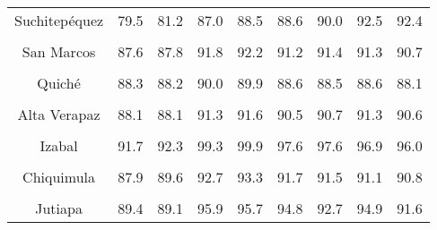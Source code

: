{\begin{tabular}[t]{ccccccccc}
Suchitepéquez & 79.5 & 81.2 & 87.0 & 88.5 & 88.6 & 90.0 & 92.5 & 92.4\\
\cellcolor[HTML]{B6B3FF}{Retalhuleu} & \cellcolor[HTML]{B6B3FF}{88.3} & \cellcolor[HTML]{B6B3FF}{86.5} & \cellcolor[HTML]{B6B3FF}{95.1} & \cellcolor[HTML]{B6B3FF}{94.4} & \cellcolor[HTML]{B6B3FF}{93.8} & \cellcolor[HTML]{B6B3FF}{91.6} & \cellcolor[HTML]{B6B3FF}{93.7} & \cellcolor[HTML]{B6B3FF}{91.3}\\
San Marcos & 87.6 & 87.8 & 91.8 & 92.2 & 91.2 & 91.4 & 91.3 & 90.7\\
\cellcolor[HTML]{B6B3FF}{Huehuetenango} & \cellcolor[HTML]{B6B3FF}{86.8} & \cellcolor[HTML]{B6B3FF}{85.7} & \cellcolor[HTML]{B6B3FF}{88.1} & \cellcolor[HTML]{B6B3FF}{86.3} & \cellcolor[HTML]{B6B3FF}{87.2} & \cellcolor[HTML]{B6B3FF}{84.5} & \cellcolor[HTML]{B6B3FF}{86.5} & \cellcolor[HTML]{B6B3FF}{83.1}\\
Quiché & 88.3 & 88.2 & 90.0 & 89.9 & 88.6 & 88.5 & 88.6 & 88.1\\
\cellcolor[HTML]{B6B3FF}{Baja Verapaz} & \cellcolor[HTML]{B6B3FF}{84.8} & \cellcolor[HTML]{B6B3FF}{85.4} & \cellcolor[HTML]{B6B3FF}{89.0} & \cellcolor[HTML]{B6B3FF}{89.7} & \cellcolor[HTML]{B6B3FF}{85.6} & \cellcolor[HTML]{B6B3FF}{86.6} & \cellcolor[HTML]{B6B3FF}{85.6} & \cellcolor[HTML]{B6B3FF}{86.2}\\
Alta Verapaz & 88.1 & 88.1 & 91.3 & 91.6 & 90.5 & 90.7 & 91.3 & 90.6\\
\cellcolor[HTML]{B6B3FF}{Petén} & \cellcolor[HTML]{B6B3FF}{89.8} & \cellcolor[HTML]{B6B3FF}{89.7} & \cellcolor[HTML]{B6B3FF}{99.5} & \cellcolor[HTML]{B6B3FF}{99.1} & \cellcolor[HTML]{B6B3FF}{95.7} & \cellcolor[HTML]{B6B3FF}{95.2} & \cellcolor[HTML]{B6B3FF}{93.0} & \cellcolor[HTML]{B6B3FF}{91.6}\\
Izabal & 91.7 & 92.3 & 99.3 & 99.9 & 97.6 & 97.6 & 96.9 & 96.0\\
\cellcolor[HTML]{B6B3FF}{Zacapa} & \cellcolor[HTML]{B6B3FF}{86.8} & \cellcolor[HTML]{B6B3FF}{90.0} & \cellcolor[HTML]{B6B3FF}{92.7} & \cellcolor[HTML]{B6B3FF}{96.6} & \cellcolor[HTML]{B6B3FF}{91.6} & \cellcolor[HTML]{B6B3FF}{94.0} & \cellcolor[HTML]{B6B3FF}{91.2} & \cellcolor[HTML]{B6B3FF}{93.3}\\
Chiquimula & 87.9 & 89.6 & 92.7 & 93.3 & 91.7 & 91.5 & 91.1 & 90.8\\
\cellcolor[HTML]{B6B3FF}{Jalapa} & \cellcolor[HTML]{B6B3FF}{84.8} & \cellcolor[HTML]{B6B3FF}{85.3} & \cellcolor[HTML]{B6B3FF}{89.5} & \cellcolor[HTML]{B6B3FF}{89.7} & \cellcolor[HTML]{B6B3FF}{88.5} & \cellcolor[HTML]{B6B3FF}{88.7} & \cellcolor[HTML]{B6B3FF}{89.8} & \cellcolor[HTML]{B6B3FF}{88.7}\\
Jutiapa & 89.4 & 89.1 & 95.9 & 95.7 & 94.8 & 92.7 & 94.9 & 91.6\\
\bottomrule
\end{tabular}}
